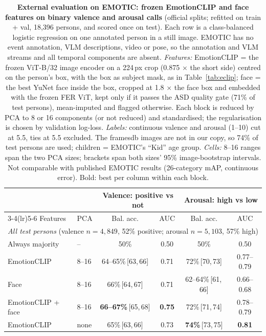 \documentclass[11pt]{article}
\newcommand{\best}[1]{\textbf{#1}}
\newcommand{\ci}[2]{\,[#1,\,#2]}
\begin{document}
\begin{table}[!htbp]
\centering
\caption{\textbf{External evaluation on EMOTIC: frozen EmotionCLIP and face features on binary valence and arousal calls} (official splits; refitted on train + val, 18,396 persons, and scored once on test). Each row is a class-balanced logistic regression on one annotated person in a still image. EMOTIC has no event annotation, VLM descriptions, video or pose, so the annotation and VLM streams and all temporal components are absent.
\emph{Features:} EmotionCLIP = the frozen ViT-B/32 image encoder on a 224\,px crop (0.875 $\times$ the short side) centred on the person's box, with the box as subject mask, as in Table~\ref{tab:eclip}; face = the best YuNet face inside the box, cropped at 1.8 $\times$ the face box and embedded with the frozen FER ViT, kept only if it passes the ASD quality gate (71\% of test persons), mean-imputed and flagged otherwise. Each block is reduced by PCA to 8 or 16 components (or not reduced) and standardised; the regularisation is chosen by validation log-loss.
\emph{Labels:} continuous valence and arousal (1--10) cut at 5.5, ties at 5.5 excluded. The framesdb images are not in our copy, so 74\% of test persons are used; children = EMOTIC's ``Kid'' age group.
\emph{Cells:} 8--16 ranges span the two PCA sizes; brackets span both sizes' 95\% image-bootstrap intervals. Not comparable with published EMOTIC results (26-category mAP, continuous error). Bold: best per column within each block.}
\label{tab:emotic}
\small
\begin{tabular}{llcccc}
\toprule
 & & \multicolumn{2}{c}{Valence: positive vs not} & \multicolumn{2}{c}{Arousal: high vs low} \\
\cmidrule(lr){3-4}\cmidrule(lr){5-6}
Features & PCA & Bal. acc. & AUC & Bal. acc. & AUC \\
\midrule
\multicolumn{6}{l}{\emph{All test persons} (valence $n{=}4{,}849$, 52\% positive; arousal $n{=}5{,}103$, 57\% high)} \\
Always majority & -- & 50\% & 0.50 & 50\% & 0.50 \\
EmotionCLIP & 8--16 & 64--65\%\ci{63}{66} & 0.71 & 72\%\ci{70}{73} & 0.77--0.79 \\
Face & 8--16 & 66\%\ci{64}{67} & 0.71 & 62--64\%\ci{61}{66} & 0.66--0.68 \\
EmotionCLIP + face & 8--16 & \best{66--67\%}\ci{65}{68} & \best{0.75} & 72\%\ci{71}{74} & 0.78--0.79 \\
EmotionCLIP & none & 65\%\ci{63}{66} & 0.73 & \best{74\%}\ci{73}{75} & \best{0.81} \\

\end{tabular}
\end{table}
\end{document}
